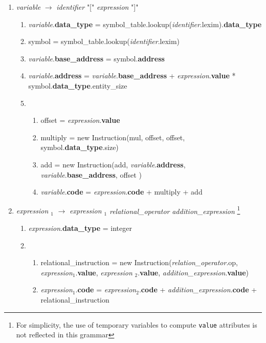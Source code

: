 \documentclass[12pt]{article}
\newcommand{\sub}[1]{$_{#1}$}
\begin{document}
\begin{enumerate}[label = \arabic*.]
\item \textit{ variable } $\rightarrow$ \textit{ identifier } "[" \textit{ expression } "]"
\begin{enumerate}[label = \roman*.]
\item \textit{variable}.\textbf{data\_type} = symbol\_table.lookup(\textit{identifier}.lexim).\textbf{data\_type}
\item symbol = symbol\_table.lookup(\textit{identifier}.lexim)
\item \textit{variable}.\textbf{base\_address} = symbol.\textbf{address}
\item \textit{variable}.\textbf{address} = \textit{variable}.\textbf{base\_address} + \textit{expression}.\textbf{value} * symbol.\textbf{data\_type}.entity\_size
\item
\begin{enumerate}[label = \alph*.]
\item offset = \textit{expression}.\textbf{value}
\item multiply = new Instruction(mul, offset, offset, symbol.\textbf{data\_type}.size)
\item add = new Instruction(add, \textit{variable}.\textbf{address}, \textit{variable}.\textbf{base\_address}, offset )
\item \textit{variable}.\textbf{code} = \textit{expression}.\textbf{code} + multiply + add
\end{enumerate}
\end{enumerate}

\item \textit{ expression \sub{1}} $\rightarrow$ \textit{ expression \sub{1}} \textit{ relational\_operator } \textit{ addition\_expression }\footnote{For simplicity, the use of temporary variables to compute \texttt{value} attributes is not reflected in this grammar}
\begin{enumerate}[label = \roman*.]
\item \textit{expression}.\textbf{data\_type} = integer
\item \begin{enumerate}[label = \alph*.]
\item relational\_instruction = new Instruction(\textit{relation\_operator}.op, \textit{expression}\sub{1}.\textbf{value}, \textit{expression} \sub{2}.\textbf{value}, \textit{addition\_expression}.\textbf{value})
\item \textit{expression}\sub{1}.\textbf{code} = \textit{expression}\sub{2}.\textbf{code} + \textit{addition\_expression}.\textbf{code} + relational\_instruction
\end{enumerate}
\end{enumerate}


\end{enumerate}
\end{document}
